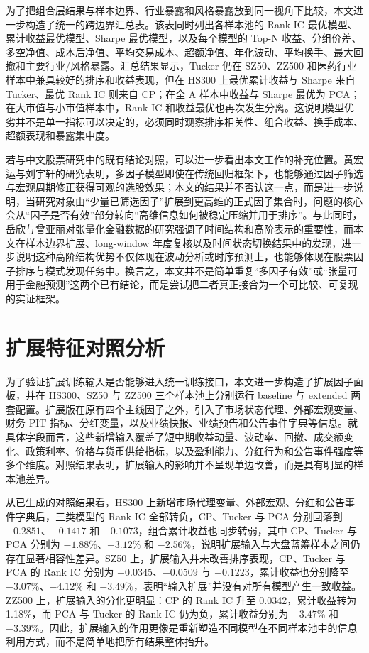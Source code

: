 为了把组合层结果与样本边界、行业暴露和风格暴露放到同一视角下比较，本文进一步构造了统一的跨边界汇总表。该表同时列出各样本池的 Rank IC 最优模型、累计收益最优模型、Sharpe 最优模型，以及每个模型的 Top-N 收益、分组价差、多空净值、成本后净值、平均交易成本、超额净值、年化波动、平均换手、最大回撤和主要行业/风格暴露。汇总结果显示，Tucker 仍在 SZ50、ZZ500 和医药行业样本中兼具较好的排序和收益表现，但在 HS300 上最优累计收益与 Sharpe 来自 Tucker、最优 Rank IC 则来自 CP；在全 A 样本中收益与 Sharpe 最优为 PCA；在大市值与小市值样本中，Rank IC 和收益最优也再次发生分离。这说明模型优劣并不是单一指标可以决定的，必须同时观察排序相关性、组合收益、换手成本、超额表现和暴露集中度。

若与中文股票研究中的既有结论对照，可以进一步看出本文工作的补充位置。黄宏运与刘宇轩的研究表明，多因子模型即使在传统回归框架下，也能够通过因子筛选与宏观周期修正获得可观的选股效果；本文的结果并不否认这一点，而是进一步说明，当研究对象由“少量已筛选因子”扩展到更高维的正式因子集合时，问题的核心会从“因子是否有效”部分转向“高维信息如何被稳定压缩并用于排序”。与此同时，岳欣与曾亚丽对张量化金融数据的研究强调了时间结构和高阶表示的重要性，而本文在样本边界扩展、long-window 年度复核以及时间状态切换结果中的发现，进一步说明这种高阶结构优势不仅体现在波动分析或时序预测上，也能够体现在股票因子排序与模式发现任务中。换言之，本文并不是简单重复“多因子有效”或“张量可用于金融预测”这两个已有结论，而是尝试把二者真正接合为一个可比较、可复现的实证框架。

\section{扩展特征对照分析}

为了验证扩展训练输入是否能够进入统一训练接口，本文进一步构造了扩展因子面板，并在 HS300、SZ50 与 ZZ500 三个样本池上分别运行 baseline 与 extended 两套配置。扩展版在原有四个主线因子之外，引入了市场状态代理、外部宏观变量、财务 PIT 指标、分红变量，以及业绩快报、业绩预告和公告事件字典等信息。就具体字段而言，这些新增输入覆盖了短中期收益动量、波动率、回撤、成交额变化、政策利率、价格与货币供给指标，以及盈利能力、分红行为和公告事件强度等多个维度。对照结果表明，扩展输入的影响并不呈现单边改善，而是具有明显的样本池差异。

从已生成的对照结果看，HS300 上新增市场代理变量、外部宏观、分红和公告事件字典后，三类模型的 Rank IC 全部转负，CP、Tucker 与 PCA 分别回落到 $-0.2851$、$-0.1417$ 和 $-0.1073$，组合累计收益也同步转弱，其中 CP、Tucker 与 PCA 分别为 $-1.88\%$、$-3.12\%$ 和 $-2.56\%$，说明扩展输入与大盘蓝筹样本之间仍存在显著相容性差异。SZ50 上，扩展输入并未改善排序表现，CP、Tucker 与 PCA 的 Rank IC 分别为 $-0.0345$、$-0.0509$ 与 $-0.1223$，累计收益也分别降至 $-3.07\%$、$-4.12\%$ 和 $-3.49\%$，表明“输入扩展”并没有对所有模型产生一致收益。ZZ500 上，扩展输入的分化更明显：CP 的 Rank IC 升至 0.0342，累计收益转为 1.18\%，而 PCA 与 Tucker 的 Rank IC 仍为负，累计收益分别为 $-3.47\%$ 和 $-3.39\%$。因此，扩展输入的作用更像是重新塑造不同模型在不同样本池中的信息利用方式，而不是简单地把所有结果整体抬升。

